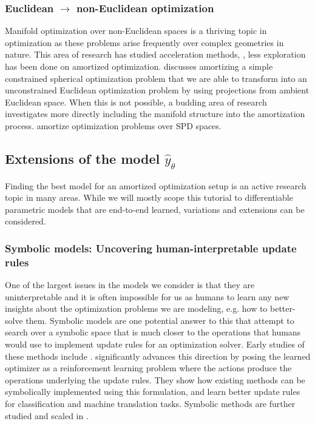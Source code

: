 \documentclass[twoside,11pt]{article}
\newcommand{\eg}{e.g.\xspace}
\begin{document}
\subsubsection{Euclidean $\rightarrow$ non-Euclidean optimization}
Manifold optimization \citep{absil2009optimization,hu2019brief}
over non-Euclidean spaces is a thriving topic in optimization
as these problems arise frequently over complex geometries in nature.
This area of research has studied acceleration methods,
\citep{duruisseaux2022accelerated}, less exploration
has been done on amortized optimization.
 discusses amortizing a simple
constrained spherical optimization problem that we are able
to transform into an unconstrained Euclidean optimization
problem by using projections from ambient Euclidean space.
When this is not possible, a budding area of research investigates
more directly including the manifold structure into the
amortization process. \citet{gao2020learning} amortize optimization
problems over SPD spaces.

\subsection{Extensions of the model $\hat y_\theta$}
Finding the best model for an amortized optimization setup
is an active research topic in many areas.
While we will mostly scope this tutorial to differentiable
parametric models that are end-to-end learned,
variations and extensions can be considered.

\subsubsection{Symbolic models: Uncovering human-interpretable update rules}
One of the largest issues in the models we consider
is that they are uninterpretable and it is often impossible
for us as humans to learn any new insights about the optimization
problems we are modeling, \eg how to better-solve them.
Symbolic models are one potential answer to this that attempt
to search over a symbolic space that is much closer to the
operations that humans would use to implement update rules for
an optimization solver.
Early studies of these methods include
\citet{bengio1994use,runarsson2000evolution}.
\citet{bello2017neural} significantly advances this direction
by posing the learned optimizer as a reinforcement learning problem
where the actions produce the operations underlying the update rules.
They show how existing methods can be symbolically implemented
using this formulation, and learn better update rules for
classification and machine translation tasks.
Symbolic methods are further studied and scaled in
\citet{real2020automl,zheng2022symbolic}.
\end{document}
